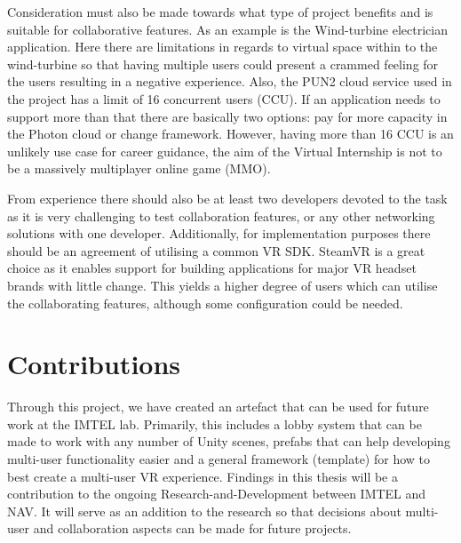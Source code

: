 Consideration must also be made towards what type of project benefits and is suitable for collaborative features. As an example is the Wind-turbine electrician application. Here there are limitations in regards to virtual space within to the wind-turbine so that having multiple users could present a crammed feeling for the users resulting in a negative experience. Also, the PUN2 cloud service used in the project has a limit of 16 concurrent users (CCU). If an application needs to support more than that there are basically two options: pay for more capacity in the Photon cloud or change framework. However, having more than 16 CCU is an unlikely use case for career guidance, the aim of the Virtual Internship is not to be a massively multiplayer online game (MMO).          

From experience there should also be at least two developers devoted to the task as it is very challenging to test collaboration features, or any other networking solutions with one developer. Additionally, for implementation purposes there should be an agreement of utilising a common VR SDK. SteamVR is a great choice as it enables support for building applications for major VR headset brands with little change. This yields a higher degree of users which can utilise the collaborating features, although some configuration could be needed.






\section{Contributions}
Through this project, we have created an artefact that can be used for future work at the IMTEL lab. Primarily, this includes a lobby system that can be made to work with any number of Unity scenes, prefabs that can help developing multi-user functionality easier and a general framework (template) for how to best create a multi-user VR experience. 
Findings in this thesis will be a contribution to the ongoing Research-and-Development between IMTEL and NAV. It will serve as an addition to the research so that decisions about multi-user and collaboration aspects can be made for future projects.   



